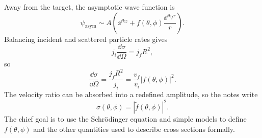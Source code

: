 Away from the target, the asymptotic wave function is
\begin{equation}
  \psi_{\mathrm{asym}}
  \sim A\left(\ee^{\ii kz}+f(\theta,\phi)\frac{\ee^{\ii k_fr}}{r}\right).
  \label{eq:qs-asym-wave}
\end{equation}
Balancing incident and scattered particle rates gives
\[
  j_i\frac{\dd\sigma}{\dd\Omega}=j_fR^2,
\]
so
\begin{equation}
  \frac{\dd\sigma}{\dd\Omega}
  =\frac{j_fR^2}{j_i}
  =\frac{v_f}{v_i}|f(\theta,\phi)|^2.
  \label{eq:qs-diff-xs-velocity}
\end{equation}
The velocity ratio can be absorbed into a redefined amplitude, so the notes write
\begin{equation}
  \sigma(\theta,\phi)=|\widetilde f(\theta,\phi)|^2.
  \label{eq:qs-diff-xs-amplitude}
\end{equation}
The chief goal is to use the Schr\"odinger equation and simple models to define $f(\theta,\phi)$ and the other quantities used to describe cross sections formally.
